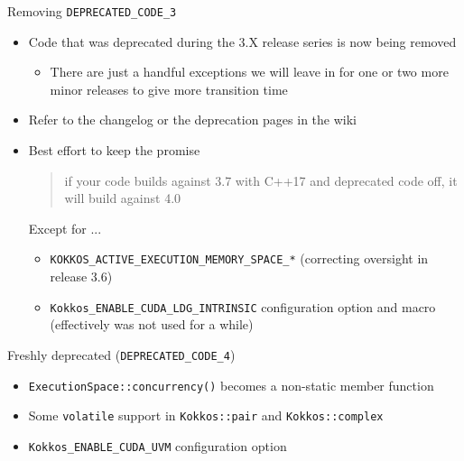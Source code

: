 \begin{frame}[fragile]{Removing \texttt{DEPRECATED\_CODE\_3}}

\begin{itemize}
\item Code that was deprecated during the 3.X release series is now being removed
  \begin{itemize}
  \item There are just a handful exceptions we will leave in for one or two more minor releases to give more transition time
  \end{itemize}
\item Refer to the changelog or the deprecation pages in the wiki
\item Best effort to keep the promise  
  \begin{quote}
  if your code builds against 3.7 with C++17 and deprecated code off, it will build against 4.0
  \end{quote}
  Except for ...
  \begin{itemize}
  \item \texttt{KOKKOS\_ACTIVE\_EXECUTION\_MEMORY\_SPACE\_*} (correcting oversight in release 3.6)
  \item \texttt{Kokkos\_ENABLE\_CUDA\_LDG\_INTRINSIC} configuration option and macro (effectively was not used for a while)
\end{itemize}
\end{itemize}

\end{frame}


\begin{frame}[fragile]{Freshly deprecated (\texttt{DEPRECATED\_CODE\_4})}

\begin{itemize}
\item \texttt{ExecutionSpace::concurrency()} becomes a non-static member function
\item Some \texttt{volatile} support in \texttt{Kokkos::pair} and \texttt{Kokkos::complex}
\item \texttt{Kokkos\_ENABLE\_CUDA\_UVM} configuration option
\end{itemize}

\end{frame}
